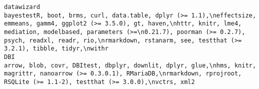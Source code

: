 \documentclass[
  letterpaper,
  DIV=11,
  numbers=noendperiod]{scrreprt}
\begin{document}
\begin{verbatim}
datawizard                                                                                                                                                                                                                                                                                                                                                                                                                                                                                                                                                                                                                                                                                                                                                                                                                                                                                                                                                                                     bayestestR, boot, brms, curl, data.table, dplyr (>= 1.1),\neffectsize, emmeans, gamm4, ggplot2 (>= 3.5.0), gt, haven,\nhttr, knitr, lme4, mediation, modelbased, parameters (>=\n0.21.7), poorman (>= 0.2.7), psych, readxl, readr, rio,\nrmarkdown, rstanarm, see, testthat (>= 3.2.1), tibble, tidyr,\nwithr
DBI                                                                                                                                                                                                                                                                                                                                                                                                                                                                                                                                                                                                                                                                                                                                                                                                                                                                                                                                                                                                                                                                                                           arrow, blob, covr, DBItest, dbplyr, downlit, dplyr, glue,\nhms, knitr, magrittr, nanoarrow (>= 0.3.0.1), RMariaDB,\nrmarkdown, rprojroot, RSQLite (>= 1.1-2), testthat (>= 3.0.0),\nvctrs, xml2

\end{verbatim}
\end{document}
